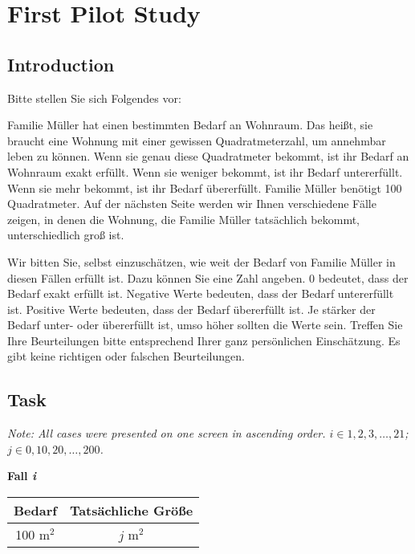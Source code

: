 \documentclass[egregdoesnotlikesansseriftitles]{scrartcl}
\begin{document}
\clearpage
\appendix


\section{First Pilot Study}\label{sec:app_pilot_1}
\subsection*{Introduction}
Bitte stellen Sie sich Folgendes vor:

Familie Müller hat einen bestimmten Bedarf an Wohnraum.
Das heißt, sie braucht eine Wohnung mit einer gewissen Quadratmeterzahl, um annehmbar leben zu können.
Wenn sie genau diese Quadratmeter bekommt, ist ihr Bedarf an Wohnraum exakt erfüllt.
Wenn sie weniger bekommt, ist ihr Bedarf untererfüllt.
Wenn sie mehr bekommt, ist ihr Bedarf übererfüllt.
Familie Müller benötigt 100 Quadratmeter.
Auf der nächsten Seite werden wir Ihnen verschiedene Fälle zeigen, in denen die Wohnung, die Familie Müller tatsächlich bekommt, unterschiedlich groß ist.

Wir bitten Sie, selbst einzuschätzen, wie weit der Bedarf von Familie Müller in diesen Fällen erfüllt ist.
Dazu können Sie eine Zahl angeben.
0 bedeutet, dass der Bedarf exakt erfüllt ist.
Negative Werte bedeuten, dass der Bedarf untererfüllt ist.
Positive Werte bedeuten, dass der Bedarf übererfüllt ist.
Je stärker der Bedarf unter- oder übererfüllt ist, umso höher sollten die Werte sein.
Treffen Sie Ihre Beurteilungen bitte entsprechend Ihrer ganz persönlichen Einschätzung.
Es gibt keine richtigen oder falschen Beurteilungen.


\subsection*{Task}
\textit{Note: All cases were presented on one screen in ascending order. $i \in {1, 2, 3, \ldots, 21}$; $j \in {0, 10, 20, \ldots, 200}$.}

\vspace{1em}
\textbf{Fall \textit{i}}

\vspace{1em}
\begin{tabular}{cc}\hline
   Bedarf      & Tatsächliche Größe   \\\hline\hline
   100 m$^2$   & $j$ m$^2$            \\\hline
\end{tabular}
\end{document}
